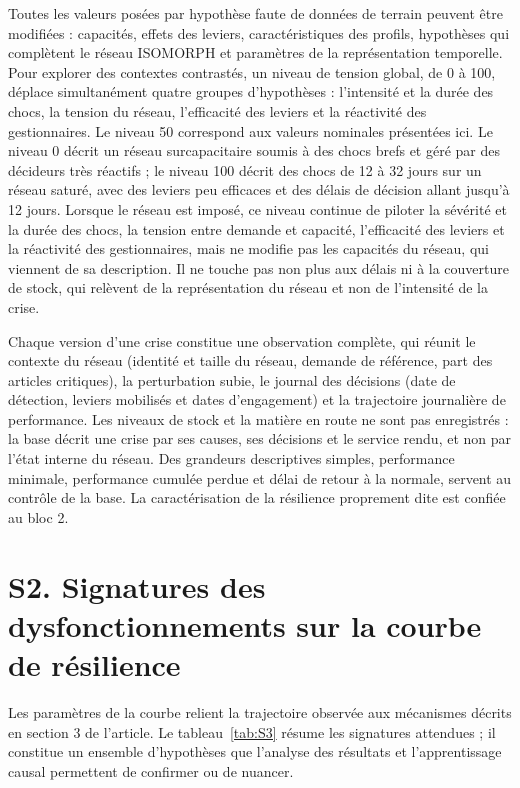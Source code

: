 Toutes les valeurs posées par hypothèse faute de données de terrain peuvent être modifiées : capacités, effets des leviers, caractéristiques des profils, hypothèses qui complètent le réseau ISOMORPH et paramètres de la représentation temporelle. Pour explorer des contextes contrastés, un niveau de tension global, de 0 à 100, déplace simultanément quatre groupes d'hypothèses : l'intensité et la durée des chocs, la tension du réseau, l'efficacité des leviers et la réactivité des gestionnaires. Le niveau 50 correspond aux valeurs nominales présentées ici. Le niveau 0 décrit un réseau surcapacitaire soumis à des chocs brefs et géré par des décideurs très réactifs ; le niveau 100 décrit des chocs de 12 à 32 jours sur un réseau saturé, avec des leviers peu efficaces et des délais de décision allant jusqu'à 12 jours. Lorsque le réseau est imposé, ce niveau continue de piloter la sévérité et la durée des chocs, la tension entre demande et capacité, l'efficacité des leviers et la réactivité des gestionnaires, mais ne modifie pas les capacités du réseau, qui viennent de sa description. Il ne touche pas non plus aux délais ni à la couverture de stock, qui relèvent de la représentation du réseau et non de l'intensité de la crise.

Chaque version d'une crise constitue une observation complète, qui réunit le contexte du réseau (identité et taille du réseau, demande de référence, part des articles critiques), la perturbation subie, le journal des décisions (date de détection, leviers mobilisés et dates d'engagement) et la trajectoire journalière de performance. Les niveaux de stock et la matière en route ne sont pas enregistrés : la base décrit une crise par ses causes, ses décisions et le service rendu, et non par l'état interne du réseau. Des grandeurs descriptives simples, performance minimale, performance cumulée perdue et délai de retour à la normale, servent au contrôle de la base. La caractérisation de la résilience proprement dite est confiée au bloc 2.

\section*{S2. Signatures des dysfonctionnements sur la courbe de résilience}

Les paramètres de la courbe relient la trajectoire observée aux mécanismes décrits en section 3 de l'article. Le tableau~\ref{tab:S3} résume les signatures attendues ; il constitue un ensemble d'hypothèses que l'analyse des résultats et l'apprentissage causal permettent de confirmer ou de nuancer.

